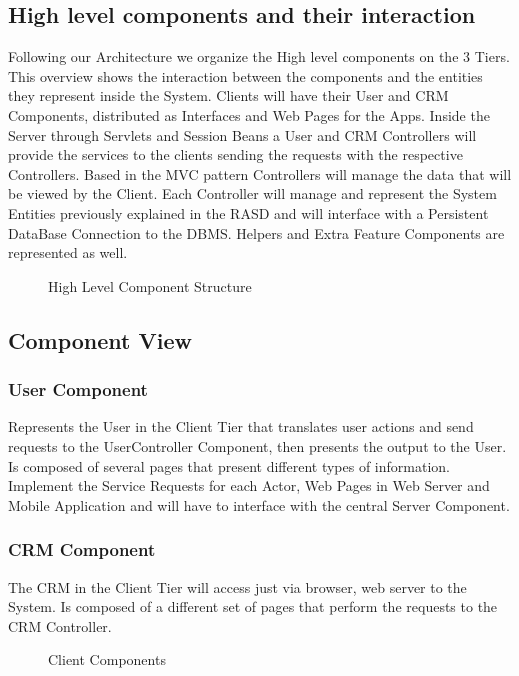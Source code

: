 \documentclass[a4paper]{article}
\begin{document}
\subsection{High level components and their interaction}
Following our Architecture we organize the High level components on the 3 Tiers. This overview shows the interaction between the components and the entities they represent inside the System. Clients will have their User and CRM Components, distributed as Interfaces and Web Pages for the Apps. Inside the Server through Servlets and Session Beans a User and CRM Controllers will provide the services to the clients sending the requests with the respective Controllers. Based in the MVC pattern Controllers will manage the data that will be viewed by the Client. Each Controller will manage and represent the System Entities previously explained in the RASD and will interface with a Persistent DataBase Connection to the DBMS. Helpers and Extra Feature Components are represented as well.

\begin{figure}[h]
\centering
\vspace*{\fill}
\noindent{}%
\caption {High Level Component Structure}
\vspace*{0.5cm}
\end{figure}

\newpage
\subsection{Component View}
\subsubsection{User Component}
Represents the User in the Client Tier that translates user actions and send requests to the UserController Component, then presents the output to the User. Is composed of several pages that present different types of information. Implement the Service Requests for each Actor, Web Pages in Web Server and Mobile Application and will have to interface with the central Server Component.
\subsubsection{CRM Component}
The CRM in the Client Tier will access just via browser, web server to the System. Is composed of a different set of pages that perform the requests to the CRM Controller.
\begin{figure}[h]
\centering
\vspace*{\fill}
\noindent{}%
\caption {Client Components}
\vspace*{0.5cm}
\end{figure}
\end{document}
